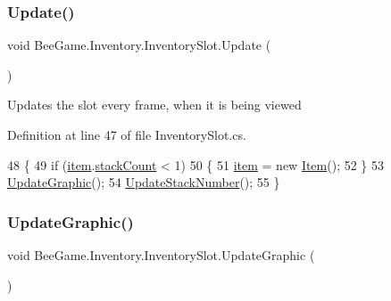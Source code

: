 \subsubsection{\texorpdfstring{Update()}{Update()}}
{\footnotesize\ttfamily void Bee\+Game.\+Inventory.\+Inventory\+Slot.\+Update (\begin{DoxyParamCaption}{ }\end{DoxyParamCaption})\hspace{0.3cm}{\ttfamily [private]}}



Updates the slot every frame, when it is being viewed 



Definition at line 47 of file Inventory\+Slot.\+cs.


\begin{DoxyCode}
48         \{
49             \textcolor{keywordflow}{if} (\hyperlink{class_bee_game_1_1_inventory_1_1_inventory_slot_a31b201e7eef9ed0001a447b3f76a7a81}{item}.\hyperlink{struct_bee_game_1_1_items_1_1_item_aaa169917b0e0f8472f20398d5d448388}{stackCount} < 1)
50             \{
51                 \hyperlink{class_bee_game_1_1_inventory_1_1_inventory_slot_a31b201e7eef9ed0001a447b3f76a7a81}{item} = \textcolor{keyword}{new} \hyperlink{struct_bee_game_1_1_items_1_1_item}{Item}();
52             \}
53             \hyperlink{class_bee_game_1_1_inventory_1_1_inventory_slot_abe33997cbde05772253494f20f949483}{UpdateGraphic}();
54             \hyperlink{class_bee_game_1_1_inventory_1_1_inventory_slot_a58cc9b63c6af1dceccee17210b73f70d}{UpdateStackNumber}();
55         \}
\end{DoxyCode}
\mbox{\label{class_bee_game_1_1_inventory_1_1_inventory_slot_abe33997cbde05772253494f20f949483}} 
\subsubsection{\texorpdfstring{Update\+Graphic()}{UpdateGraphic()}}
{\footnotesize\ttfamily void Bee\+Game.\+Inventory.\+Inventory\+Slot.\+Update\+Graphic (\begin{DoxyParamCaption}{ }\end{DoxyParamCaption})}



